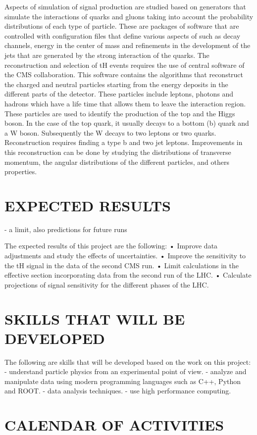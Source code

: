 \documentclass[final,3p]{CSP}
\begin{document}
Aspects of simulation of signal production are studied based on generators that simulate the interactions of quarks and gluons taking 
into account the probability distributions of each type of particle. These are packages of software that are controlled with 
configuration files that define various aspects of such as decay channels, energy in the center of mass and refinements in the development of the jets that are generated by the strong interaction of the quarks. The reconstruction and selection of tH events requires the use of central software of the CMS collaboration. This software contains the algorithms that reconstruct the charged and neutral particles starting from the energy deposits in the different parts of the detector. These particles include leptons, photons and hadrons which have a life time that allows them to leave the interaction region. These particles are used to identify the production of the top and the Higgs boson. In the case of the top quark, it usually decays to a bottom (b) quark and a W boson. Subsequently the W decays to two leptons or two quarks. Reconstruction requires finding a type b and two jet leptons. Improvements in this reconstruction can be done by studying the distributions of transverse momentum, the angular distributions of the different particles, and others properties.

\section{EXPECTED RESULTS}
- a limit, also predictions for future runs

The expected results of this project are the following:
• Improve data adjustments and study the effects of uncertainties.
• Improve the sensitivity to the tH signal in the data of the second CMS run.
• Limit calculations in the effective section incorporating data from the second
run of the LHC.
• Calculate projections of signal sensitivity for the different phases of the LHC.


\cleardoublepage



\appendix
\section{SKILLS THAT WILL BE DEVELOPED}
The following are skills that will be developed based on the work on this project:
- understand particle physics from an experimental point of view.
- analyze and manipulate data using modern programming languages such as C++, Python and ROOT.
- data analysis techniques.
- use high performance computing.

\section{CALENDAR OF ACTIVITIES}
\end{document}
